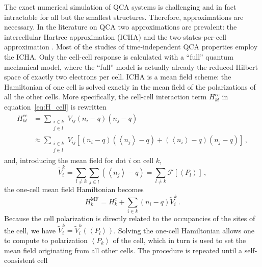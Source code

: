 The exact numerical simulation of QCA systems is challenging and in fact
intractable for all but the smallest structures. Therefore, approximations are
necessary. In the literature on QCA two approximations are prevalent: the
intercellular Hartree approximation (ICHA) and the two-states-per-cell
approximation \cite{lent1993quantum} \cite{tougaw1996dynamic}. Most of the
studies of time-independent QCA properties employ the ICHA. Only the cell-cell
response is calculated with a ``full'' quantum mechanical model, where the
``full'' model is actually already the reduced Hilbert space of exactly two
electrons per cell. ICHA is a mean field scheme: the Hamiltonian of one cell is
solved exactly in the mean field of the polarizations of all the other cells.
More specifically, the cell-cell interaction term $H^{cc}_{kl}$ in
equation~\eqref{eq:H_cell} is rewritten
\begin{equation}
\begin{split}
  \label{eq:H_kl_meanfield}
  H^{cc}_{kl} 
  &=
  \sum_{\substack{i \in k\\j \in l}} V_{ij} \left( n_i - q \right) \left( n_j - q \right) \\
  &\approx
  \sum_{\substack{i \in k\\j \in l}} V_{ij} 
       \left[ \left( n_i - q \right) \left( \left< n_j \right> - q \right)
              +
              \left( \left< n_i \right> - q \right) \left( n_j - q \right)
       \right] \, ,
\end{split}
\end{equation}
and, introducing the mean field for dot $i$ on cell $k$,
\begin{equation}
  \label{eq:V_meanfield}
  \tilde{V}_i^k
  = \sum_{l \ne k} \sum_{j \in l} \left( \left< n_j \right> - q \right)
  = \sum_{l \ne k} \mathcal{F} \left[ \left< P_l \right> \right] \, ,
\end{equation}
the one-cell mean field Hamiltonian becomes
\begin{equation}
  \label{eq:H_meanfield}
  H^{\mathrm{MF}}_k
  = H^c_k + \sum_{i \in k} \left( n_i - q \right) \tilde{V}_i^k \, .
\end{equation}
Because the cell polarization is directly related to the occupancies of the
sites of the cell, we have $\tilde{V}_i^k = \tilde{V}_i^k(\left<P_l\right>)$.
Solving the one-cell Hamiltonian allows one to compute to polarization $\left< P_k
\right>$ of the cell, which in turn is used to set the mean field originating
from all other cells. The procedure is repeated until a self-consistent cell
